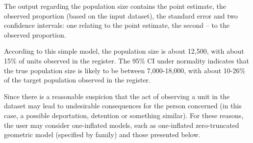 \documentclass[nojss]{jss}
\newcommand{\1}{\mathcal{I}} \newcommand{\bZero}{\boldsymbol{0}}
\begin{document}
The output regarding the population size contains the point estimate,
the observed proportion (based on the input dataset), the standard error
and two confidence intervals: one relating to the point estimate, the
second -- to the observed proportion.

According to this simple model, the population size is about 12,500,
with about 15\% of units observed in the register. The 95\% CI under
normality indicates that the true population size is likely to be
between 7,000-18,000, with about 10-26\% of the target population
observed in the register.

Since there is a reasonable suspicion that the act of observing a unit
in the dataset may lead to undesirable consequences for the person
concerned (in this case, a possible deportation, detention or something
similar). For these reasons, the user may consider one-inflated models,
such as one-inflated zero-truncated geometric model (specified by
 family) and those presented below.
\end{document}
